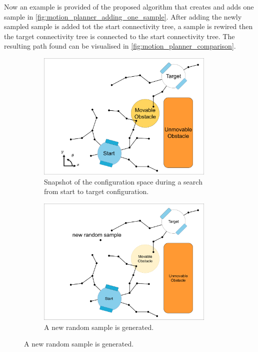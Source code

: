 \begin{algorithm}[H]
\begin{algorithmic}[1]
{{\EndWhile
}}
\end{algorithmic}
\end{algorithm}

\newpage
Now an example is provided of the proposed algorithm that creates and adds one sample in \cref{fig:motion_planner_adding_one_sample}. After adding the newly sampled sample is added tot the start connectivity tree, a sample is rewired then the target connectivity tree is connected to the start connectivity tree. The resulting path found can be visualised in \cref{fig:motion_planner_comparison}.\bs

\begin{figure}[H]
    \centering
    \begin{subfigure}{.49\textwidth}
    \centering
    \includegraphics[width=0.93\textwidth, cfbox=my_grey 5pt 0pt]{figures/mp/1mp_init.drawio.png}
    \caption{Snapshot of the configuration space during a search\\from start to target configuration.}
    \end{subfigure}
    \begin{subfigure}{.49\textwidth}
    \centering
    \includegraphics[width=0.93\textwidth, cfbox=my_light_blue 5pt 0pt]{figures/mp/2mp_new_rand_sample.drawio.png}
    \caption{A new random sample is generated.\bs}
    \end{subfigure}


\end{figure}
